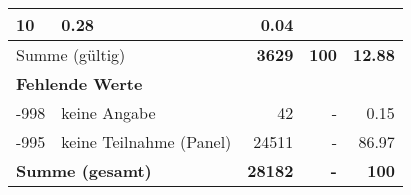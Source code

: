 \begin{longtable}{lXrrr}
       \num{10} &
       \num[round-mode=places,round-precision=2]{0.28} &
         \num[round-mode=places,round-precision=2]{0.04} \\
     \midrule
     \multicolumn{2}{l}{Summe (gültig)} &
       \textbf{\num{3629}} &
     \textbf{\num{100}} &
       \textbf{\num[round-mode=places,round-precision=2]{12.88}} \\
     \multicolumn{5}{l}{\textbf{Fehlende Werte}}\\
       -998 &
       keine Angabe &
         \num{42} &
        - &
         \num[round-mode=places,round-precision=2]{0.15} \\
       -995 &
       keine Teilnahme (Panel) &
         \num{24511} &
        - &
         \num[round-mode=places,round-precision=2]{86.97} \\
     \midrule
     \multicolumn{2}{l}{\textbf{Summe (gesamt)}} &
          \textbf{\num{28182}} &
        \textbf{-} &
        \textbf{\num{100}} \\
     \bottomrule
     \end{longtable}
     
